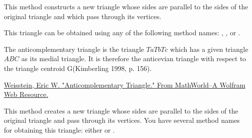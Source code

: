 \medskip

This method constructs a new triangle whose sides are parallel to the sides of the original triangle and which pass through its vertices.

\medskip

This triangle can be obtained using any of the following method names: , , or .

\vspace{1em}



The anticomplementary triangle is the triangle $TaTbTc$ which has a given triangle $ABC$ as its medial triangle. It is therefore the anticevian triangle with respect to the triangle centroid G(Kimberling 1998, p. 156).\begin{flushright}
  \small
 \href{https://mathworld.wolfram.com/AnticomplementaryTriangle.html}{Weisstein, Eric W. "Anticomplementary Triangle." From MathWorld--A Wolfram Web Resource.}
\end{flushright}

This method creates a new triangle whose sides are parallel to the sides of the original triangle and pass through its vertices.
You have several method names for obtaining this triangle: either   or .

\vspace{1em}

\begin{minipage}{.5\textwidth}
\begin{center}
\end{center}
\end{minipage}
\begin{minipage}{.5\textwidth}
\begin{tkzexample}
\end{tkzexample}
\end{minipage}

